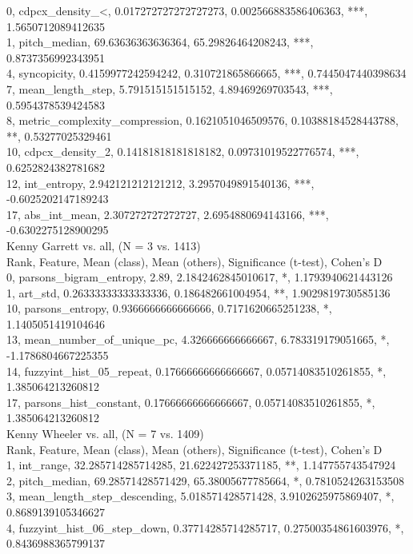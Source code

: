 0, cdpcx_density_<, 0.017272727272727273, 0.002566883586406363, ***, 1.5650712089412635\\
1, pitch_median, 69.63636363636364, 65.29826464208243, ***, 0.8737356992343951\\
4, syncopicity, 0.4159977242594242, 0.310721865866665, ***, 0.7445047440398634\\
7, mean_length_step, 5.791515151515152, 4.89469269703543, ***, 0.5954378539424583\\
8, metric_complexity_compression, 0.1621051046509576, 0.10388184528443788, **, 0.53277025329461\\
10, cdpcx_density_2, 0.14181818181818182, 0.09731019522776574, ***, 0.6252824382781682\\
12, int_entropy, 2.942121212121212, 3.2957049891540136, ***, -0.6025202147189243\\
17, abs_int_mean, 2.307272727272727, 2.6954880694143166, ***, -0.6302275128900295\\
Kenny Garrett vs. all, (N = 3 vs. 1413)\\
Rank, Feature, Mean (class), Mean (others), Significance (t-test), Cohen's D\\
0, parsons_bigram_entropy, 2.89, 2.1842462845010617, *, 1.1793940621443126\\
1, art_std, 0.26333333333333336, 0.186482661004954, **, 1.9029819730585136\\
10, parsons_entropy, 0.9366666666666666, 0.7171620665251238, *, 1.1405051419104646\\
13, mean_number_of_unique_pc, 4.326666666666667, 6.783319179051665, *, -1.1786804667225355\\
14, fuzzyint_hist_05_repeat, 0.17666666666666667, 0.05714083510261855, *, 1.385064213260812\\
17, parsons_hist_constant, 0.17666666666666667, 0.05714083510261855, *, 1.385064213260812\\
Kenny Wheeler vs. all, (N = 7 vs. 1409)\\
Rank, Feature, Mean (class), Mean (others), Significance (t-test), Cohen's D\\
1, int_range, 32.285714285714285, 21.622427253371185, **, 1.147755743547924\\
2, pitch_median, 69.28571428571429, 65.38005677785664, *, 0.7810524263153508\\
3, mean_length_step_descending, 5.018571428571428, 3.9102625975869407, *, 0.8689139105346627\\
4, fuzzyint_hist_06_step_down, 0.37714285714285717, 0.27500354861603976, *, 0.8436988365799137\\
